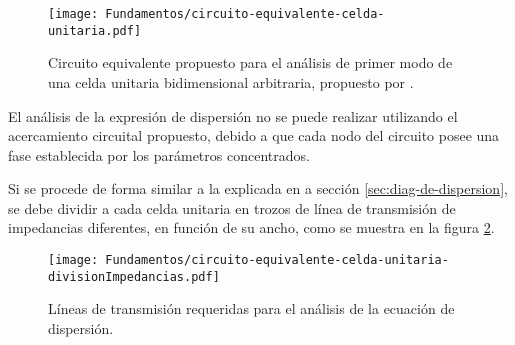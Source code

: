 \begin{figure}[h]
	\centering
	\texttt{[image: Fundamentos/circuito-equivalente-celda-unitaria.pdf]}
	\caption{Circuito equivalente propuesto para el análisis de primer modo de una celda unitaria bidimensional arbitraria, propuesto por \cite{KimSchuttAine:AnalysisHybrid}.}
	\label{fig:circuito-equivalente-kim-parches}
\end{figure}



El análisis de la expresión de dispersión no se puede realizar utilizando el acercamiento circuital propuesto, debido a que cada nodo del circuito posee una fase establecida por los parámetros concentrados.

Si se procede de forma similar a la explicada en a sección \ref{sec:diag-de-dispersion}, se debe dividir a cada celda unitaria en trozos de línea de transmisión de impedancias diferentes, en función de su ancho, como se muestra en la figura \ref{fig:division_en_trozos_impedancia}.


\begin{figure}[h]
	\centering
	\texttt{[image: Fundamentos/circuito-equivalente-celda-unitaria-divisionImpedancias.pdf]}
	\caption{Líneas de transmisión requeridas para el análisis de la ecuación de dispersión.}
	\label{fig:division_en_trozos_impedancia}
\end{figure}

